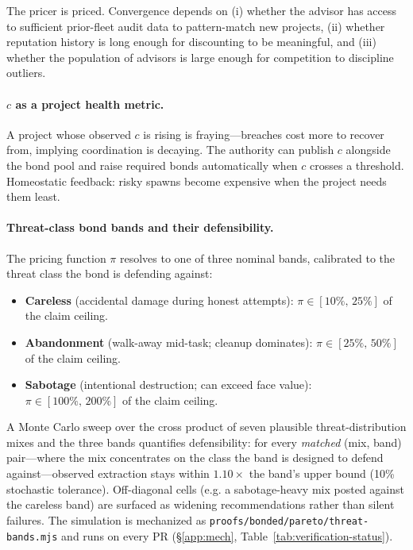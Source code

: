 \documentclass[11pt,a4paper]{article}
\theoremstyle{definition}
\theoremstyle{remark}
\begin{document}
%
The pricer is priced. Convergence depends on (i) whether the advisor has access to sufficient prior-fleet audit data to pattern-match new projects, (ii) whether reputation history is long enough for discounting to be meaningful, and (iii) whether the population of advisors is large enough for competition to discipline outliers.

\paragraph{$c$ as a project health metric.} A project whose observed $c$ is rising is fraying---breaches cost more to recover from, implying coordination is decaying. The authority can publish $c$ alongside the bond pool and raise required bonds automatically when $c$ crosses a threshold. Homeostatic feedback: risky spawns become expensive when the project needs them least.

\paragraph{Threat-class bond bands and their defensibility.}\label{sec:pricing:defensibility}
The pricing function $\pi$ resolves to one of three nominal bands, calibrated to the threat class the bond is defending against:
\begin{itemize}[nosep]
  \item \textbf{Careless} (accidental damage during honest attempts): $\pi \in [10\%,\,25\%]$ of the claim ceiling.
  \item \textbf{Abandonment} (walk-away mid-task; cleanup dominates): $\pi \in [25\%,\,50\%]$ of the claim ceiling.
  \item \textbf{Sabotage} (intentional destruction; can exceed face value): $\pi \in [100\%,\,200\%]$ of the claim ceiling.
\end{itemize}
A Monte Carlo sweep over the cross product of seven plausible threat-distribution mixes and the three bands quantifies defensibility: for every \emph{matched} (mix, band) pair---where the mix concentrates on the class the band is designed to defend against---observed extraction stays within $1.10\times$ the band's upper bound (10\% stochastic tolerance). Off-diagonal cells (e.g. a sabotage-heavy mix posted against the careless band) are surfaced as widening recommendations rather than silent failures. The simulation is mechanized as \texttt{proofs/bonded/pareto/threat-bands.mjs} and runs on every PR (\S\ref{app:mech}, Table~\ref{tab:verification-status}).
\end{document}
